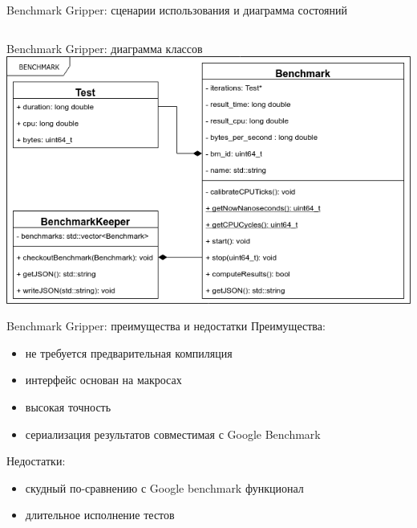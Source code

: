 \begin{frame}{Benchmark Gripper: сценарии использования и диаграмма состояний}
\begin{columns}[onlytextwidth]
\begin{column}{0.49\textwidth}
		\end{column}
	\end{columns}
\end{frame}

\begin{frame}{Benchmark Gripper: диаграмма классов}
\centering
	\includegraphics[scale=.46]{img/class.png}
\end{frame}

\begin{frame}{Benchmark Gripper: преимущества и недостатки}
	Преимущества:
	\begin{itemize}
		\item не требуется предварительная компиляция
		\item интерфейс основан на макросах
		\item высокая точность
		\item сериализация результатов совместимая с Google Benchmark
	\end{itemize}
	Недостатки:
	\begin{itemize}
		\item скудный по-сравнению с Google benchmark функционал
		\item длительное исполнение тестов
	\end{itemize}
\end{frame}


